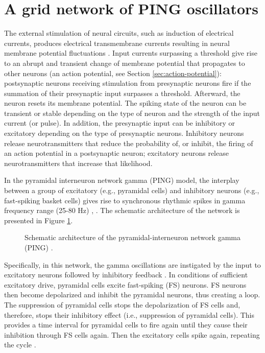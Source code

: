 \section{A grid network of PING oscillators}
\label{sec:grid-ping}

The external stimulation of neural circuits, such as induction of electrical currents, produces electrical transmembrane currents resulting in neural membrane potential fluctuations \cite{IzhikevichBook2004:2}. Input currents surpassing a threshold give rise to an abrupt and transient change of membrane potential that propagates to other neurons (an action potential, see Section \ref{sec:action-potential}): postsynaptic neurons receiving stimulation from presynaptic neurons fire if the summation of their presynaptic input surpasses a threshold. Afterward, the neuron resets its membrane potential. The spiking state of the neuron can be transient or stable depending on the type of neuron and the strength of the input current (or pulse). In addition, the presynaptic input can be inhibitory or excitatory depending on the type of presynaptic neurons. Inhibitory neurons release neurotransmitters that reduce the probability of, or inhibit, the firing of an action potential in a postsynaptic neuron; excitatory neurons release neurotransmitters that increase that likelihood. 

In the pyramidal interneuron network gamma (PING) model, the interplay between a group of  excitatory (e.g., pyramidal cells) and inhibitory neurons (e.g., fast-spiking basket cells) gives rise to synchronous rhythmic spikes in gamma frequency range (25-80 Hz)  \cite{Whittington2000}, \cite{Borgers2003}. The schematic architecture of the network is presented in Figure \ref{fig:single-ping}.

\begin{figure}[!htp]
    \centering
    
    \caption[Schematic architecture of PING]{Schematic architecture of the pyramidal-interneuron network gamma (PING) \cite{Lowet2015}.}
    \label{fig:single-ping}
\end{figure}

Specifically, in this network, the gamma oscillations are instigated by the input to excitatory neurons followed by inhibitory feedback \cite{Whittington2000}. In conditions of sufficient excitatory drive, pyramidal cells excite fast-spiking (FS) neurons. FS neurons then become depolarized and inhibit the pyramidal neurons, thus creating a loop. The suppression of pyramidal cells stops the depolarization of FS cells and, therefore, stops their inhibitory effect (i.e., suppression of pyramidal cells). This provides a time interval for pyramidal cells to fire again until they cause their inhibition through FS cells again. Then the excitatory cells spike again, repeating the cycle \cite{Kopell2011}.

